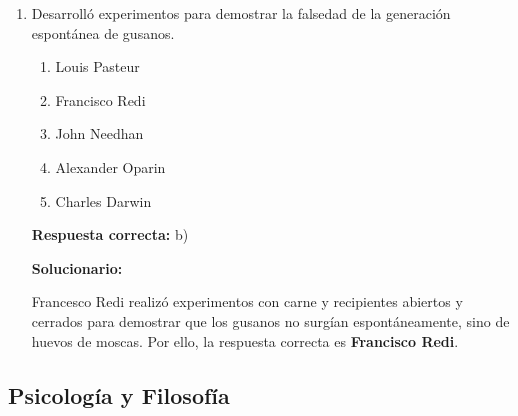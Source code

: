\begin{enumerate}[resume]
	\vspace{2mm}
	\textbf{Solucionario:}
	
	Si los gemelos son del mismo sexo, genéticamente idénticos y muy parecidos físicamente, entonces proceden de un solo cigoto que luego se dividió.  
	Por eso se trata de gemelos \textbf{monocigóticos}.
	
	\vspace{6mm}
	
	\item Desarrolló experimentos para demostrar la falsedad de la generación espontánea de gusanos.
	\begin{enumerate}[label=\alph*)]
		\item Louis Pasteur
		\item Francisco Redi
		\item John Needhan
		\item Alexander Oparin
		\item Charles Darwin
	\end{enumerate}
	\textbf{Respuesta correcta:} b)
	
	\vspace{2mm}
	\textbf{Solucionario:}
	
	Francesco Redi realizó experimentos con carne y recipientes abiertos y cerrados para demostrar que los gusanos no surgían espontáneamente, sino de huevos de moscas.  
	Por ello, la respuesta correcta es \textbf{Francisco Redi}.
	
	\vspace{6mm}
\end{enumerate}

\subsection*{Psicología y Filosofía}

